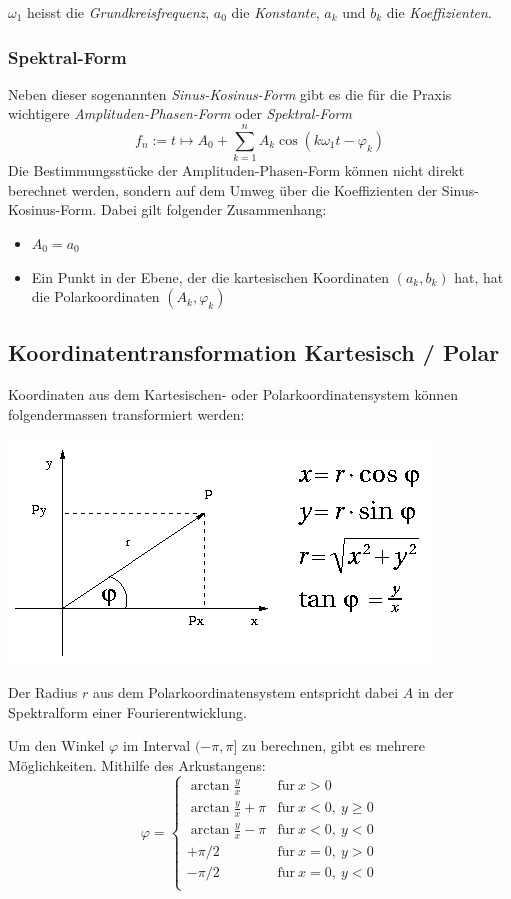 \documentclass[10pt,a4paper]{scrartcl}
\begin{document}
$\omega_1$ heisst die \textit{Grundkreisfrequenz}, $a_0$ die \textit{Konstante},
$a_k$ und $b_k$ die \textit{Koeffizienten}.

\subsubsection{Spektral-Form}
Neben dieser sogenannten \textit{Sinus-Kosinus-Form} gibt es die für die
Praxis wichtigere \textit{Amplituden-Phasen-Form} oder \textit{Spektral-Form}
$$f_n := t \mapsto A_0 + \sum_{k=1}^n A_k \cos(k\omega_1t - \varphi_k)$$
Die Bestimmungsstücke der Amplituden-Phasen-Form können nicht direkt
berechnet werden, sondern auf dem Umweg über die Koeffizienten
der Sinus-Kosinus-Form. Dabei gilt folgender Zusammenhang:
\begin{itemize}
\item $A_0 = a_0$
\item Ein Punkt in der Ebene, der die kartesischen Koordinaten $(a_k, b_k)$
hat, hat die Polarkoordinaten $(A_k, \varphi_k)$
\end{itemize}


\subsection{Koordinatentransformation Kartesisch / Polar}

Koordinaten aus dem Kartesischen- oder Polarkoordinatensystem können
folgendermassen transformiert werden:

\begin{center}
\includegraphics[scale=0.5]{img/Koordinatentransformation.png}
\end{center}

Der Radius $r$ aus dem Polarkoordinatensystem entspricht dabei $A$ in der
Spektralform einer Fourierentwicklung.

Um den Winkel $\varphi$ im Interval $(-\pi, \pi]$ zu berechnen, gibt es mehrere
Möglichkeiten. Mithilfe des Arkustangens:
$$\varphi = \begin{cases}
\arctan\frac{y}{x} & \mathrm{f\ddot ur}\ x > 0\\
\arctan\frac{y}{x} + \pi & \mathrm{f\ddot ur}\ x < 0,\ y \geq 0\\
\arctan\frac{y}{x} - \pi & \mathrm{f\ddot ur}\ x < 0,\ y < 0\\
+\pi/2 & \mathrm{f\ddot ur}\ x = 0,\ y > 0\\
-\pi/2 & \mathrm{f\ddot ur}\ x = 0,\ y < 0\\
\end{cases}$$
\end{document}
